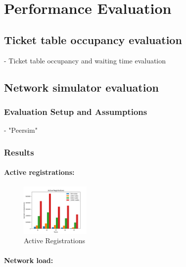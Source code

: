 
\section{Performance Evaluation}

\subsection{Ticket table occupancy evaluation}

- Ticket table occupancy  and waiting time evaluation

\subsection{Network simulator evaluation}

\subsubsection{Evaluation Setup and Assumptions}

- "Peersim"~\cite{p2p09-peersim}


\subsubsection{Results}

\paragraph{\bf{Active registrations}:}

\begin{figure}[h!]
\centering
\includegraphics[width=0.3\textwidth]{img/eval/registration_origin.png}
\caption{Active Registrations}
\label{fig:regs}
\vspace{-0.15in}
\end{figure}

\paragraph{\bf{Network load}:}


